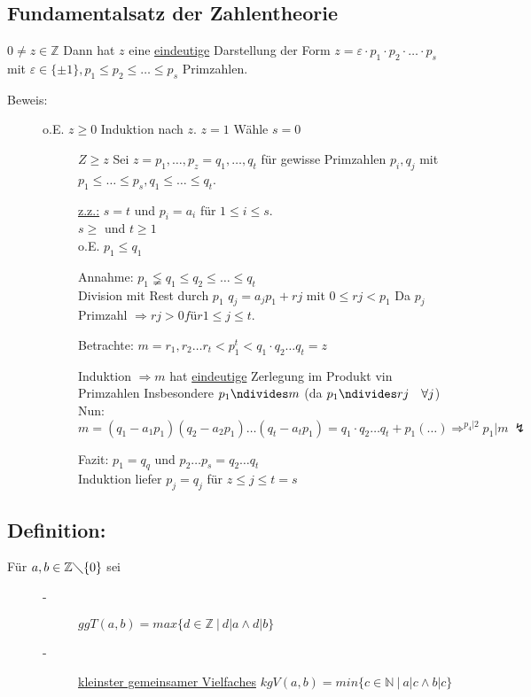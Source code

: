 \subsection{Fundamentalsatz der Zahlentheorie} 
$0 \neq z \in \mathbb{Z}$ Dann hat $z$ eine \underline{eindeutige} Darstellung der Form $z = \varepsilon \cdot p_{1} \cdot p_{2} \cdot \dotsc   \cdot p_{s}$ mit $\varepsilon \in \{\pm1 \}, p_{1}\leq p_{2} \leq \dotsc   \leq p_{s}$ Primzahlen.
	\begin{description}
		\item[Beweis:] o.E. $z \geq 0$ Induktion nach $z$. $z = 1$ Wähle $s = 0$
		\begin{description}
			\item[] \underline{$Z \geq z$} Sei $z =p_{1}, \dotsc , p_{z} = q_{1}, \dotsc , q_{t}$ für gewisse 
				Primzahlen $p_{i}, q_{j}$ mit $p_{1} \leq \dotsc   \leq p_{s}, q_{1} \leq \dotsc   \leq q_{t}$.
			\item[] \underline{z.z.:} $s=t$ und $p_{i} = a_{i}$ für $1 \leq i \leq s$.\\
				$s \geq$ und $ t\geq 1$\\
				o.E. $p_{1} \leq q_{1}$
			\item[] Annahme: $p_{1} \lneqq q_{1} \leq q_{2} \leq \dotsc \leq q_{t}$ \\
				Division mit Rest durch $p_{1}$ \qquad $q_{j} = a_{j} p_{1} + rj$ mit $0 \leq rj < p_{1}$ Da 
				$p_{j}$ Primzahl $\Rightarrow rj > 0 für 1 \leq j \leq t$.
			\item[] Betrachte: $m=r_{1}, r_{2} \dotsc r_{t} < p^{t}_{1} < q_{1} \cdot q_{2} \dotsc q_{t} = z$
			\item[] Induktion $\Rightarrow m$ hat \underline{eindeutige} Zerlegung im Produkt vin Primzahlen 
				 Insbesondere $p_{1}\ndivides m$ (da $p_{1}\ndivides rj \quad \forall j$) \\
				Nun: $m = (q_{1} -a_{1}p_{1})(q_{2}-a_{2}p_{1})\dotsc (q_{t}-a_{t}p_{1}) = q_{1} \cdot q_{2} 
				\dotsc q_{t} + p_{1} (\dotsc) \Rightarrow^{p_{4}|2} p_{1}|m \ \lightning$
			\item[] Fazit: $p_{1} = q_{q}$ und $p_{2} \dotsc p_{s} = q_{2} \dotsc q_{t}$\\
					Induktion liefer $p_{j} = q_{j}$ für $z \leq j \leq t =s$
		\end{description}
	\end{description}
%
%
%
\subsection{Definition:} Für $a,b \in \mathbb{Z}\diagdown\{0\}$ sei
	\begin{description}
	\item[] 
		\begin{description}
		\item[]
		\item[-] $ggT(a,b) = max \{d\in \mathbb{Z} \ | \ d|a \wedge d|b\}$
		\item[-] \underline{kleinster gemeinsamer Vielfaches} $kgV(a,b) = min\{c\in\mathbb{N} \ | \ a|c\wedge b|c\}$
		\end{description}
	\end{description}
%
%
%

